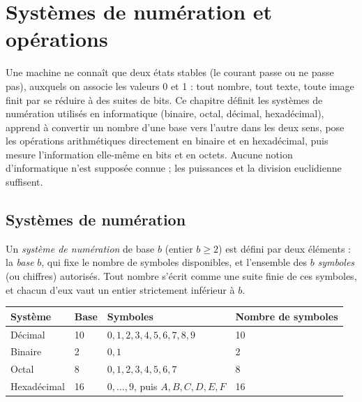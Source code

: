 \chapter{Systèmes de numération et opérations}

\begin{quelqueslignes}
Une machine ne connaît que deux états stables (le courant passe ou ne passe pas), auxquels on associe les valeurs 0 et 1 : tout nombre, tout texte, toute image finit par se réduire à des suites de bits. Ce chapitre définit les systèmes de numération utilisés en informatique (binaire, octal, décimal, hexadécimal), apprend à convertir un nombre d'une base vers l'autre dans les deux sens, pose les opérations arithmétiques directement en binaire et en hexadécimal, puis mesure l'information elle-même en bits et en octets. Aucune notion d'informatique n'est supposée connue ; les puissances et la division euclidienne suffisent.
\end{quelqueslignes}

\section{Systèmes de numération}

\begin{definition}
Un \emph{système de numération} de base $b$ (entier $b \geqslant 2$) est défini par deux éléments : la \emph{base} $b$, qui fixe le nombre de symboles disponibles, et l'ensemble des $b$ \emph{symboles} (ou chiffres) autorisés. Tout nombre s'écrit comme une suite finie de ces symboles, et chacun d'eux vaut un entier strictement inférieur à $b$.
\end{definition}

\begin{center}
\small
\begin{tabular}{L{2.3cm}C{1.2cm}L{8.3cm}C{2.3cm}}
\toprule
{}\textbf{Système} & \textbf{Base} & \textbf{Symboles} & \textbf{Nombre de symboles}\\
\midrule
Décimal & 10 & $0, 1, 2, 3, 4, 5, 6, 7, 8, 9$ & 10\\
Binaire & 2 & $0, 1$ & 2\\
Octal & 8 & $0, 1, 2, 3, 4, 5, 6, 7$ & 8\\
Hexadécimal & 16 & $0,\dots,9$, puis $A, B, C, D, E, F$ & 16\\
\bottomrule
\end{tabular}
\label{ch3:tab:systemes}
\end{center}

